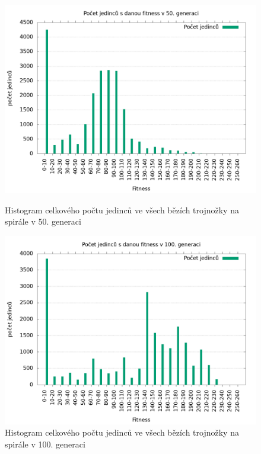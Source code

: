 \begin{figure}[h]
    \begin{minipage}[c]{0.48\linewidth}
        \includegraphics[width=\linewidth]{obrazky/trojnozka_spirala_fitnessHistogram50.png}
        \caption{Histogram celkového počtu jedinců ve všech bězích trojnožky na spirále v 50. generaci}
    \end{minipage}
    \hfill
    \begin{minipage}[c]{0.48\linewidth}
        \includegraphics[width=\linewidth]{obrazky/trojnozka_spirala_fitnessHistogram100.png}
        \caption{Histogram celkového počtu jedinců ve všech bězích trojnožky na spirále v 100. generaci}
    \end{minipage}
\end{figure}

